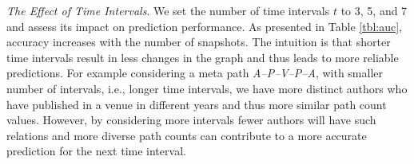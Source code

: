 

\textit{The Effect of Time Intervals}. We set the number of time intervals $t$ to 3, 5, and 7 and assess its impact on prediction performance. As presented in Table \ref{tbl:auc}, accuracy increases with the number of snapshots. The intuition is that shorter time intervals result in less changes in the graph and thus leads to more reliable predictions. For example considering a meta path \textit{A--P--V--P--A}, with smaller number of intervals, i.e., longer time intervals, we have more distinct authors who have published in a venue in different years and thus more similar path count values. However, by considering more intervals fewer authors will have such relations and more diverse path counts can contribute to a more accurate prediction for the next time interval.


